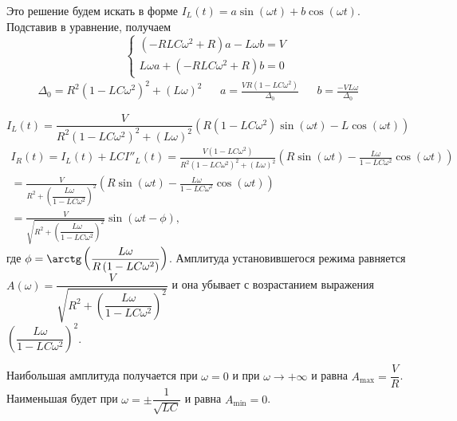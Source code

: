 \documentclass[a5paper,10pt]{article}
\newcommand{\br}[1]{\left(#1\right)}
\theoremstyle{definition}
\begin{document}
Это решение будем искать в форме $I_{L}\br{t} = a \sin\br{\omega t} + b \cos\br{\omega t}$. Подставив в уравнение, получаем
$$\begin{cases}
        \br{-RLC\omega^2 + R} a - L\omega b = V \\
        L\omega a + \br{-RLC\omega^2 + R} b = 0
    \end{cases}$$
\begin{align*}
    \Delta_{0} = R^2\br{1 - LC\omega^2}^2 + \br{L\omega}^2 &&
    a = \frac {VR\br{1 - LC\omega^2}} {\Delta_{0}} &&
    b = \frac {-VL\omega} {\Delta_{0}} &&
\end{align*}

$$I_{L}\br{t} = \frac{V}{R^2\br{1 - LC\omega^2}^2 + \br{L\omega}^2} \br{R\br{1 - LC\omega^2} \sin\br{\omega t} - L \cos\br{\omega t}}$$
\begin{equation*}
    \begin{split}
        I_{R}\br{t} = I_{L}\br{t} + LCI''_{L}\br{t} = \frac {V\br{1 - LC\omega^2}} {R^2\br{1 - LC\omega^2}^2 + \br{L\omega}^2} \br{R \sin\br{\omega t} - \frac {L\omega} {1 - LC\omega^2} \cos\br{\omega t}} & \\
        = \frac {V} {R^2 + \br{\dfrac {L\omega}{1 - LC\omega^2}}^2} \br{R \sin\br{\omega t} - \frac {L\omega} {1 - LC\omega^2} \cos\br{\omega t}} & \\
        = \frac {V} {\sqrt{R^2 + \br{\dfrac {L\omega}{1 - LC\omega^2}}^2}} \sin\br{\omega t - \phi},
    \end{split}
\end{equation*}
где $\phi = \arctg\br{\dfrac{L\omega}{R\br{1 - LC\omega^2}}}$.
Амплитуда установившегося режима равняется \linebreak $A\br{\omega} = \dfrac {V} {\sqrt{R^2 + \br{\dfrac {L\omega}{1 - LC\omega^2}}^2}}$ и она убывает с возрастанием выражения $\br{\dfrac {L\omega}{1 - LC\omega^2}}^2$.

Наибольшая амплитуда получается при $\omega = 0$ и при $\omega \to +\infty$ и равна $A_{\max} = \dfrac{V}{R}$. Наименьшая будет при $\omega = \pm \dfrac {1} {\sqrt{LC}}$ и равна $A_{\min} = 0$.
\end{document}
